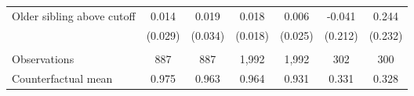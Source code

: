 {{\begin{tabular}{lcccccc}
Older sibling above cutoff&       0.014   &       0.019   &       0.018   &       0.006   &      -0.041   &       0.244   \\
                    &     (0.029)   &     (0.034)   &     (0.018)   &     (0.025)   &     (0.212)   &     (0.232)   \\
                    &               &               &               &               &               &               \\
Observations        &         887   &         887   &       1,992   &       1,992   &         302   &         300   \\
Counterfactual mean &       0.975   &       0.963   &       0.964   &       0.931   &       0.331   &       0.328   \\
 

\bottomrule
\end{tabular}
}
}
